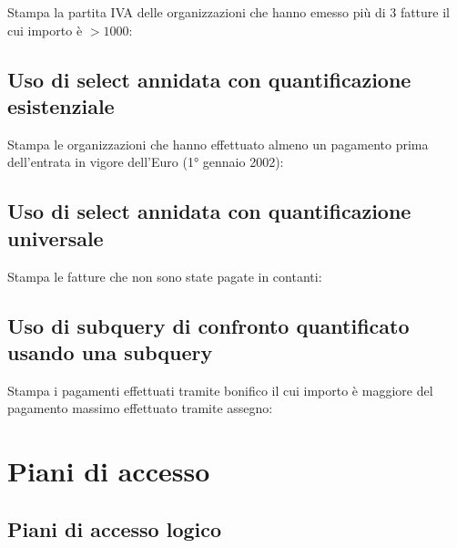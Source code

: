 \documentclass[a4paper,12pt]{article}
\begin{document}
Stampa la partita IVA delle organizzazioni che hanno emesso più di 3 fatture il cui importo è $> 1000$:

\begin{minipage}{\textwidth}

\end{minipage}

 \subsection{ Uso di select annidata con quantificazione esistenziale }

Stampa le organizzazioni che hanno effettuato almeno un pagamento prima dell'entrata in vigore dell'Euro (1° gennaio 2002):

\begin{minipage}{\textwidth}

\end{minipage}

 \subsection{ Uso di select annidata con quantificazione universale }

Stampa le fatture che non sono state pagate in contanti:

\begin{minipage}{\textwidth}

\end{minipage}

 \subsection{ Uso di subquery di confronto quantificato usando una subquery }

Stampa i pagamenti effettuati tramite bonifico il cui importo è maggiore del pagamento massimo effettuato tramite assegno:

\begin{minipage}{\textwidth}

\end{minipage}

 \section{ Piani di accesso }

 \subsection{ Piani di accesso logico }
\end{document}
